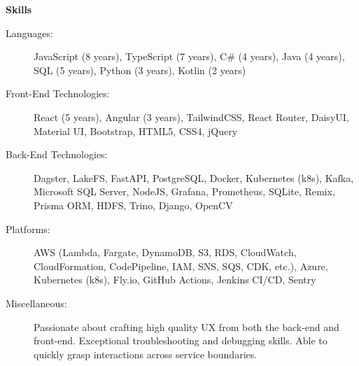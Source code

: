 \documentclass[letterpaper,11pt]{article}
\newcommand{\resheading}[1]{{\large \colorbox{mygrey}{\begin{minipage}{\textwidth}{\textbf{#1 \vphantom{p\^{E}}}}\end{minipage}}}}
\begin{document}
\resheading{Skills}
\begin{description}
	\item[Languages:]
	JavaScript (8 years), TypeScript (7 years), C\# (4 years), Java (4 years), SQL (5 years), Python (3 years), Kotlin (2 years) 
	\item[Front-End Technologies:]
	React (5 years), Angular (3 years), TailwindCSS, React Router, DaisyUI, Material UI, Bootstrap, HTML5, CSS4, jQuery
	\item[Back-End Technologies:]
	Dagster, LakeFS, FastAPI, PostgreSQL, Docker, Kubernetes (k8s), Kafka, Microsoft SQL Server, NodeJS, Grafana, Prometheus, SQLite, Remix, Prisma ORM, HDFS, Trino, Django, OpenCV
	\item[Platforms:]
	AWS (Lambda, Fargate, DynamoDB, S3, RDS, CloudWatch, CloudFormation, CodePipeline, IAM, SNS, SQS, CDK, etc.), Azure, Kubernetes (k8s), Fly.io, GitHub Actions, Jenkins CI/CD, Sentry
	\item[Miscellaneous:]
	Passionate about crafting high quality UX from both the back-end and front-end. Exceptional troubleshooting and debugging skills. Able to quickly grasp interactions across service boundaries.
\end{description}
\end{document}
